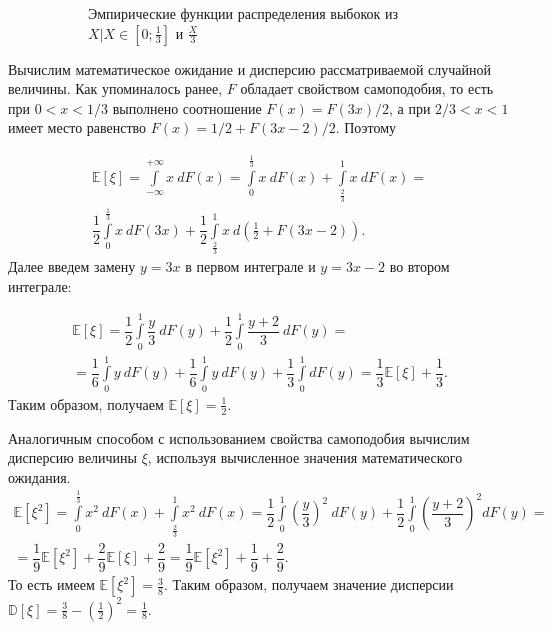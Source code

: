 \begin{figure}
\begin{subfigure}[b]{0.45\textwidth}
         \caption{Эмпирические функции распределения выбокок из
           $ X | X \in [0;\frac{1}{3}] $ и $ \frac{X}{3} $}
         \label{subfig:self-similarity}
     \end{subfigure}
     \caption{}
     \label{fig:cantor_properties}
\end{figure}

Вычислим математическое ожидание и дисперсию рассматриваемой случайной величины. 
Как упоминалось ранее, $ F $ обладает свойством самоподобия, то есть при
 $  0<x<1/3 $ выполнено соотношение $ F(x)=F(3x)/2 $, а при $ 2/3<x<1 $
 имеет место равенство $ F(x)=1/2+F(3x-2)/2 $. Поэтому

\begin{multline*}
\mathbb{E}[\xi] = \int\limits_{-\infty}^{+\infty} x \ dF(x) =
 \int\limits_{0}^{\frac{1}{3}} x \ dF(x) + \int\limits_{\frac{2}{3}}^{1} x \ dF(x) = \\
 \dfrac{1}{2} \int\limits_{0}^{\frac{1}{3}} x \ dF(3 x) + \dfrac{1}{2}
 \int\limits_{\frac{2}{3}}^{1} x \ d(\frac{1}{2} + F(3x - 2)).
\end{multline*}
Далее введем замену $y=3x$ в первом интеграле и $y=3x-2$ во втором интеграле:

\begin{multline*}
     \mathbb{E}[\xi] = \dfrac{1}{2} \int\limits_{0}^{1} \dfrac{y}{3} \ dF(y)
     + \dfrac{1}{2} \int\limits_{0}^{1} \dfrac{y+2}{3} \ dF(y) = \\
     = \dfrac{1}{6} \int\limits_{0}^{1} y \ dF(y) + \dfrac{1}{6}
     \int\limits_{0}^{1} y \ dF(y) + \dfrac{1}{3} \int\limits_{0}^{1} dF(y) =
     \dfrac{1}{3} \mathbb{E}[\xi] + \dfrac{1}{3}.
\end{multline*}
Таким образом, получаем $ \mathbb{E}[\xi] = \frac{1}{2} $.

Аналогичным способом с использованием свойства самоподобия вычислим дисперсию
 величины $ \xi $, используя вычисленное значения математического ожидания.
\begin{multline*}
     \mathbb{E}[\xi^2] = \int\limits_{0}^{\frac{1}{3}} x^2 \ dF(x) +
      \int\limits_{\frac{2}{3}}^{1} x^2 \ dF(x) = \dfrac{1}{2}\int\limits_{0}^{1}
      \left( \dfrac{y}{3} \right)^2 \ dF(y) + \dfrac{1}{2} \int\limits_{0}^{1}
      \left(\dfrac{y+2}{3}\right)^2dF(y) =\\
      = \dfrac{1}{9} \mathbb{E}[\xi^2] + \dfrac{2}{9} \mathbb{E}[\xi] + \dfrac{2}{9} =
      \dfrac{1}{9} \mathbb{E}[\xi^2] + \dfrac{1}{9} + \dfrac{2}{9}.
\end{multline*}
То есть имеем $ \mathbb{E}[\xi^2] = \frac{3}{8} $. Таким образом, получаем значение
 дисперсии $ \mathbb{D}[\xi] = \frac{3}{8} - (\frac{1}{2})^2 = \frac{1}{8} $.

